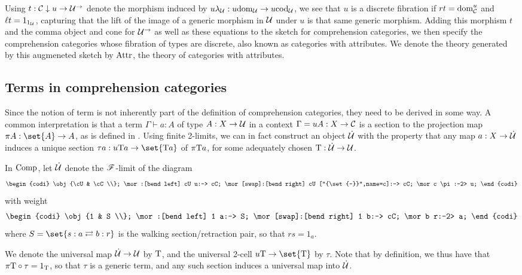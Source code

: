 \documentclass[../thesis.tex]{subfiles}
\begin{document}
Using $t : {\mathcal{C}} \mathrel{\downarrow} u \to {\mathcal{U}}^\to$ denote the morphism induced by $u\lambda_{\mathcal{U}} : u{\mathrm{dom}}_{\mathcal{U}} \to u{\mathrm{cod}}_{\mathcal{U}}$,
we see that $u$ is a discrete fibration if $rt = {\mathrm{dom}}^u_{\mathcal{C}}$ and $\ell t = 1_{1_{\mathcal{U}}}$, capturing that the lift
of the image of a generic morphism in ${\mathcal{U}}$ under $u$ is that same generic morphism. Adding this morphism $t$
and the comma object and cone for ${\mathcal{U}}^\to$ as well as these equations to the sketch for comprehension categories,
we then specify the comprehension categories whose fibration of types are discrete, also known as categories with
attributes. We denote the theory generated by this augmeneted sketch by ${\mathrm{Attr}}$, the theory of categories with
attributes.

\subsection{Terms in comprehension categories}\label{subsec:compcat terms}
Since the notion of term is not inherently part of the definition of comprehension categories, they need to be
derived in some way. A common interpretation is that a term $\Gamma \vdash a : A$ of type $A : X \to {\mathcal{U}}$ in
a context $\Gamma = uA : X \to {\mathcal{C}}$ is a section to the projection map $\pi A : \set{A} \to A$, as is defined
in \cite{jacobs1993}. Using finite 2-limits, we can in fact construct an object $\dot{{\mathcal{U}}}$ with the property
that any map $a : X \to \dot{{\mathcal{U}}}$ induces a unique section $\tau a : u\typ a \to \set{\typ a}$ of $\pi{{\mathrm{T}}} a$,
for some adequately chosen ${{\mathrm{T}}} : \dot{{\mathcal{U}}} \to {\mathcal{U}}$. 

\begin{definition}
  In ${\mathrm{Comp}}$, let $\dot{{\mathcal{U}}}$ denote the ${\mathscr{F}}$-limit of the diagram
  \[\begin{codi}
    \obj {\cU & \cC \\};
    \mor:[bend left] cU u:-> cC;
    \mor[swap]:[bend right] cU ["{\set{-}}",name=c]:-> cC;
    \mor c \pi:-2> u;
  \end{codi}\]
  with weight
  \[\begin{codi}
    \obj {1 & S \\};
    \mor:[bend left] 1 a:-> S;
    \mor[swap]:[bend right] 1 b:-> cC;
    \mor b r:-2> a;
  \end{codi}\]
  where $S = \set{s : a \rightleftarrows b : r}$ is the walking section/retraction pair, so that $rs = 1_a$.

  We denote the universal map $\dot{{\mathcal{U}}} \to {\mathcal{U}}$ by ${{\mathrm{T}}}$, and the universal 2-cell $u\typ \to \set{\typ}$
  by $\tau$. Note that by definition, we thus have that $\pi {{\mathrm{T}}} \circ \tau = 1_{{\mathrm{T}}}$, so that $\tau$ is
  a generic term, and any such section induces a universal map into $\dot{{\mathcal{U}}}$.
\end{definition}
\end{document}
